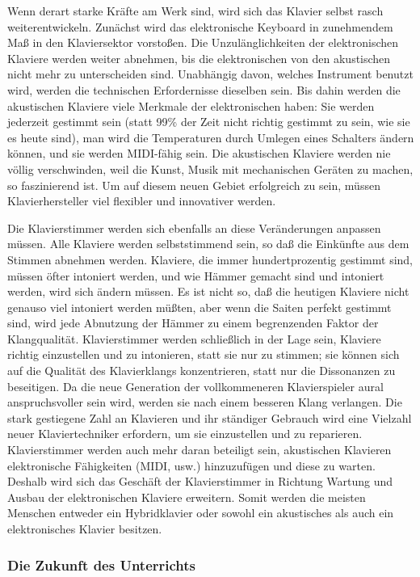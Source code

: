 Wenn derart starke Kräfte am Werk sind, wird sich das Klavier selbst rasch weiterentwickeln.
Zunächst wird das elektronische Keyboard in zunehmendem Maß in den Klaviersektor vorstoßen.
Die Unzulänglichkeiten der elektronischen Klaviere werden weiter abnehmen, bis die elektronischen von den akustischen nicht mehr zu unterscheiden sind.
Unabhängig davon, welches Instrument benutzt wird, werden die technischen Erfordernisse dieselben sein.
Bis dahin werden die akustischen Klaviere viele Merkmale der elektronischen haben: Sie werden jederzeit gestimmt sein (statt 99\% der Zeit nicht richtig gestimmt zu sein, wie sie es heute sind), man wird die Temperaturen durch Umlegen eines Schalters ändern können, und sie werden MIDI-fähig sein.
Die akustischen Klaviere werden nie völlig verschwinden, weil die Kunst, Musik mit mechanischen Geräten zu machen, so faszinierend ist.
Um auf diesem neuen Gebiet erfolgreich zu sein, müssen Klavierhersteller viel flexibler und innovativer werden.

Die Klavierstimmer werden sich ebenfalls an diese Veränderungen anpassen müssen.
Alle Klaviere werden selbststimmend sein, so daß die Einkünfte aus dem Stimmen abnehmen werden.
Klaviere, die immer hundertprozentig gestimmt sind, müssen öfter intoniert werden, und
wie Hämmer gemacht sind und intoniert werden, wird sich ändern müssen.
Es ist nicht so, daß die heutigen Klaviere nicht genauso viel intoniert werden müßten, aber wenn die Saiten perfekt gestimmt sind, wird jede Abnutzung der Hämmer zu einem begrenzenden Faktor der Klangqualität.
Klavierstimmer werden schließlich in der Lage sein, Klaviere richtig einzustellen und zu intonieren, statt sie nur zu stimmen; sie können sich auf die Qualität des Klavierklangs konzentrieren, statt nur die Dissonanzen zu beseitigen.
Da die neue Generation der vollkommeneren Klavierspieler aural anspruchsvoller sein wird, werden sie nach einem besseren Klang verlangen.
Die stark gestiegene Zahl an Klavieren und ihr ständiger Gebrauch wird eine Vielzahl neuer Klaviertechniker erfordern, um sie einzustellen und zu reparieren.
Klavierstimmer werden auch mehr daran beteiligt sein, akustischen Klavieren elektronische Fähigkeiten (MIDI, usw.) hinzuzufügen und diese zu warten.
Deshalb wird sich das Geschäft der Klavierstimmer in Richtung Wartung und Ausbau der elektronischen Klaviere erweitern.
Somit werden die meisten Menschen entweder ein Hybridklavier oder sowohl ein akustisches als auch ein elektronisches Klavier besitzen.
 

\subsubsection{Die Zukunft des Unterrichts}
\label{c1iv6i}

